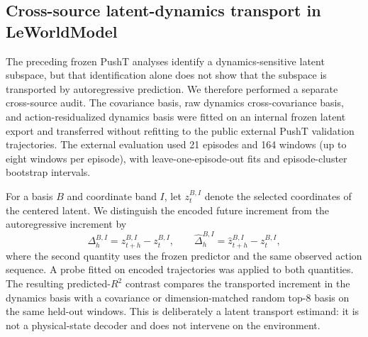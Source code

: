 \documentclass{article}
\begin{document}
\subsection{Cross-source latent-dynamics transport in LeWorldModel}
\label{sec:supp-lewm-latent-transport}

The preceding frozen PushT analyses identify a dynamics-sensitive latent
subspace, but that identification alone does not show that the subspace is
transported by autoregressive prediction. We therefore performed a separate
cross-source audit. The covariance basis, raw dynamics cross-covariance basis,
and action-residualized dynamics basis were fitted on an internal frozen
latent export and transferred without refitting to the public external PushT
validation trajectories. The external evaluation used 21 episodes and 164
windows (up to eight windows per episode), with leave-one-episode-out fits and
episode-cluster bootstrap intervals.

For a basis $B$ and coordinate band $I$, let $z_t^{B,I}$ denote the selected
coordinates of the centered latent. We distinguish the encoded future
increment from the autoregressive increment by
\begin{equation}
\Delta_h^{B,I}=z_{t+h}^{B,I}-z_t^{B,I},\qquad
\widehat{\Delta}_h^{B,I}=\widehat z_{t+h}^{B,I}-z_t^{B,I},
\label{eq:supp-lewm-transport}
\end{equation}
where the second quantity uses the frozen predictor and the same observed
action sequence. A probe fitted on encoded trajectories was applied to both
quantities. The resulting predicted-$R^2$ contrast compares the transported
increment in the dynamics basis with a covariance or dimension-matched random
top-$8$ basis on the same held-out windows. This is deliberately a latent
transport estimand: it is not a physical-state decoder and does not intervene
on the environment.
\end{document}
